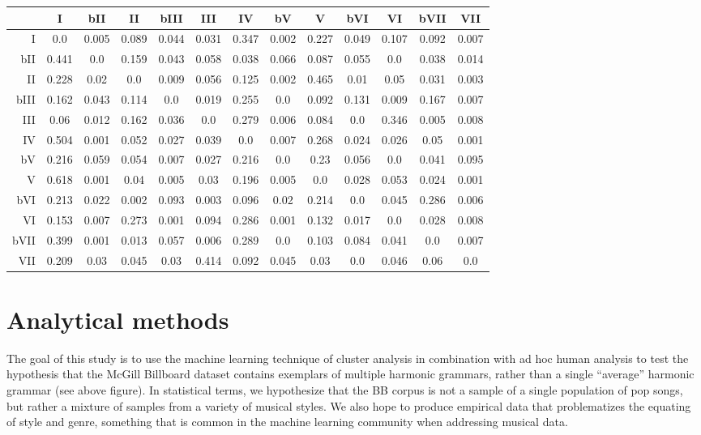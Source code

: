 \begin{table}[htbp]
\begin{minipage}{\linewidth}
\setlength{\tymax}{0.5\linewidth}
\centering
\small
\begin{tabulary}{\textwidth}{@{}RCCCCCCCCCCCC@{}} \toprule
&I&bII&II&bIII&III&IV&bV&V&bVI&VI&bVII&VII\\
\midrule
I&0.0&0.005&0.089&0.044&0.031&0.347&0.002&0.227&0.049&0.107&0.092&0.007\\
bII&0.441&0.0&0.159&0.043&0.058&0.038&0.066&0.087&0.055&0.0&0.038&0.014\\
II&0.228&0.02&0.0&0.009&0.056&0.125&0.002&0.465&0.01&0.05&0.031&0.003\\
bIII&0.162&0.043&0.114&0.0&0.019&0.255&0.0&0.092&0.131&0.009&0.167&0.007\\
III&0.06&0.012&0.162&0.036&0.0&0.279&0.006&0.084&0.0&0.346&0.005&0.008\\
IV&0.504&0.001&0.052&0.027&0.039&0.0&0.007&0.268&0.024&0.026&0.05&0.001\\
bV&0.216&0.059&0.054&0.007&0.027&0.216&0.0&0.23&0.056&0.0&0.041&0.095\\
V&0.618&0.001&0.04&0.005&0.03&0.196&0.005&0.0&0.028&0.053&0.024&0.001\\
bVI&0.213&0.022&0.002&0.093&0.003&0.096&0.02&0.214&0.0&0.045&0.286&0.006\\
VI&0.153&0.007&0.273&0.001&0.094&0.286&0.001&0.132&0.017&0.0&0.028&0.008\\
bVII&0.399&0.001&0.013&0.057&0.006&0.289&0.0&0.103&0.084&0.041&0.0&0.007\\
VII&0.209&0.03&0.045&0.03&0.414&0.092&0.045&0.03&0.0&0.046&0.06&0.0\\

\bottomrule

\end{tabulary}
\end{minipage}
\end{table}

\chapter{Analytical methods}
\label{analyticalmethods}

The goal of this study is to use the machine learning technique of cluster analysis in combination with ad hoc human analysis to test the hypothesis that the McGill Billboard dataset contains exemplars of multiple harmonic grammars, rather than a single ``average'' harmonic grammar (see above figure). In statistical terms, we hypothesize that the BB corpus is not a sample of a single population of pop songs, but rather a mixture of samples from a variety of musical styles. We also hope to produce empirical data that problematizes the equating of style and genre, something that is common in the machine learning community when addressing musical data.

